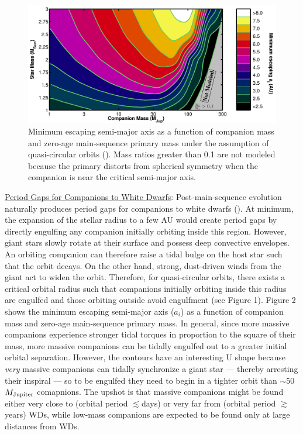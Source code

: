 \documentclass{iau_FM}
\begin{document}
\begin{figure}[b]
\begin{center}
 \includegraphics[width=5.4in]{results_fig.png} 
 \caption{Minimum escaping semi-major axis as a function of companion mass and zero-age main-sequence primary mass under the assumption of quasi-circular orbits (\cite{NS2013}).  Mass ratios greater than 0.1 are not modeled because the primary distorts from spherical symmetry when the companion is near the critical semi-major axis.}
   \label{fig2}
\end{center}
\end{figure}

{\sc\underline{Period Gaps for Companions to White Dwarfs}}: Post-main-sequence evolution naturally produces period gaps for companions to white dwarfs (\cite{2010MNRAS.408..631N, spiegel2012, NS2013}).  At minimum, the expansion of the stellar radius to a few AU would create period gaps by directly engulfing any companion initially orbiting inside this region.  However, giant stars slowly rotate at their surface and possess deep convective envelopes.  An orbiting companion can therefore raise a tidal bulge on the host star such that the orbit decays.  On the other hand, strong, dust-driven winds from the giant act to widen the orbit.  Therefore, for quasi-circular orbits, there exists a critical orbital radius such that companions initially orbiting inside this radius are engulfed and those orbiting outside avoid engulfment (see Figure 1).  Figure 2 shows the minimum escaping semi-major axis ($a_i$) as a function of companion mass and zero-age main-sequence primary mass.  In general, since more massive companions experience stronger tidal torques in proportion to the square of their mass, more massive companions can be tidally engulfed out to a greater initial orbital separation.  However, the contours have an interesting U shape because {\it very} massive companions can tidally synchronize a giant star --- thereby arresting their inspiral --- so to be engulfed they need to begin in a tighter orbit than $\sim$50~$M_{\rm Jupiter}$ comapnions.  The upshot is that massive companions might be found either very close to (orbital period $\lesssim$days) or very far from (orbital period $\gtrsim$years) WDs, while low-mass companions are expected to be found only at large distances from WDs.
\end{document}

